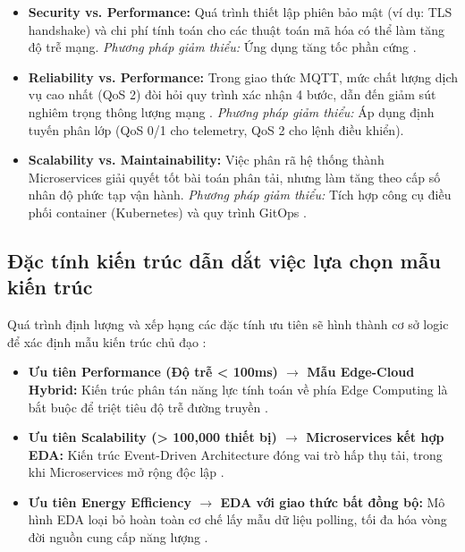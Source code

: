 \begin{itemize}
    \item \textbf{Security vs. Performance:} Quá trình thiết lập phiên bảo mật (ví dụ: TLS handshake) và chi phí tính toán cho các thuật toán mã hóa có thể làm tăng độ trễ mạng. \textit{Phương pháp giảm thiểu:} Ứng dụng tăng tốc phần cứng \cite{lea2018}.
    
    \item \textbf{Reliability vs. Performance:} Trong giao thức MQTT, mức chất lượng dịch vụ cao nhất (QoS 2) đòi hỏi quy trình xác nhận 4 bước, dẫn đến giảm sút nghiêm trọng thông lượng mạng \cite{lea2018}. \textit{Phương pháp giảm thiểu:} Áp dụng định tuyến phân lớp (QoS 0/1 cho telemetry, QoS 2 cho lệnh điều khiển).
    
    \item \textbf{Scalability vs. Maintainability:} Việc phân rã hệ thống thành Microservices giải quyết tốt bài toán phân tải, nhưng làm tăng theo cấp số nhân độ phức tạp vận hành. \textit{Phương pháp giảm thiểu:} Tích hợp công cụ điều phối container (Kubernetes) và quy trình GitOps \cite{garrison2017}.
\end{itemize}

\subsection{Đặc tính kiến trúc dẫn dắt việc lựa chọn mẫu kiến trúc}

Quá trình định lượng và xếp hạng các đặc tính ưu tiên sẽ hình thành cơ sở logic để xác định mẫu kiến trúc chủ đạo \cite{richards2020}:

\begin{itemize}
    \item \textbf{Ưu tiên Performance (Độ trễ < 100ms) $\rightarrow$ Mẫu Edge-Cloud Hybrid:} Kiến trúc phân tán năng lực tính toán về phía Edge Computing là bắt buộc để triệt tiêu độ trễ đường truyền \cite{lea2018}.
    \item \textbf{Ưu tiên Scalability (> 100,000 thiết bị) $\rightarrow$ Microservices kết hợp EDA:} Kiến trúc Event-Driven Architecture đóng vai trò hấp thụ tải, trong khi Microservices mở rộng độc lập \cite{richards2020}.
    \item \textbf{Ưu tiên Energy Efficiency $\rightarrow$ EDA với giao thức bất đồng bộ:} Mô hình EDA loại bỏ hoàn toàn cơ chế lấy mẫu dữ liệu polling, tối đa hóa vòng đời nguồn cung cấp năng lượng \cite{lea2018}.
\end{itemize}

